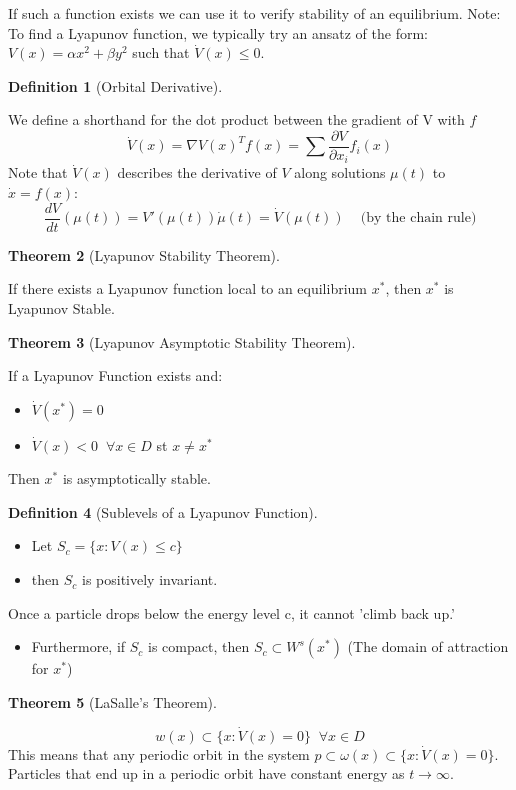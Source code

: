 \documentclass{article}
\newtheorem{thm}{Theorem}[section]
\newtheorem{defn}[thm]{Definition}
\begin{document}
If such a function exists we can use it to verify stability of an equilibrium.
Note: To find a Lyapunov function, we typically try an ansatz of the form: $V(x) = \alpha x^2 + \beta y^2$ such that $\dot V(x) \leq 0$. 

\begin{defn}[Orbital Derivative]
\end{defn}
We define a shorthand for the dot product between the gradient of V with $f$
\[ \dot V (x) = \nabla V(x)^Tf(x) = \sum \frac{\partial V}{\partial x_i} f_i(x)\]
Note that $\dot V(x)$ describes the derivative of $V$ along solutions $\mu(t)$ to $\dot x = f(x)$:
\[\frac{dV}{dt}(\mu(t)) = V'(\mu(t))\dot \mu(t) = \dot V(\mu(t)) \;\;\; \text{ (by the chain rule)}\]


\begin{thm}[Lyapunov Stability Theorem]
\end{thm}
If there exists a Lyapunov function local to an equilibrium $x^*$, then $x^*$ is Lyapunov Stable.

\begin{thm}[Lyapunov Asymptotic Stability Theorem]
\end{thm}
If a Lyapunov Function exists and: 
\begin{itemize}
    \item $\dot V(x^*) = 0$
    \item $\dot V(x) < 0 \;\; \forall x \in D $
 st $x \neq x^*$ 
 \end{itemize}
Then $x^*$ is asymptotically stable.

\begin{defn}[Sublevels of a Lyapunov Function]
\end{defn}
\begin{itemize}
    \item Let $S_c = \{x : V(x) \leq c\}$
    \item then $S_c$ is positively invariant. 
\end{itemize}
Once a particle drops below the energy level c, it cannot 'climb back up.'

\begin{itemize}
    \item Furthermore, if $S_c$ is compact, then $S_c \subset W^s(x^*)$ (The domain of attraction for $x^*$) 
\end{itemize}

\begin{thm}[LaSalle's Theorem]\end{thm}
\[w(x) \subset \{x : \dot V(x) = 0\} \; \; \forall x \in D\]
This means that any periodic orbit in the system $p \subset \omega(x) \subset \{x : \dot V(x) = 0\}$. Particles that end up in a periodic orbit have constant energy as $t\to\infty$.
\end{document}
